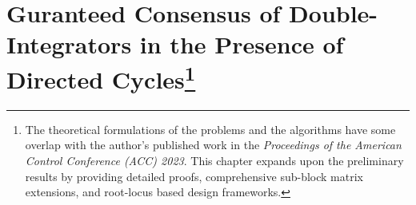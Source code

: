 \chapter[Guaranteed Consensus in Directed Cyclic Networks]{Guranteed Consensus of Double-Integrators in the Presence of Directed Cycles\footnote{The theoretical formulations of the problems and the algorithms have some overlap with the author's published work in the \emph{Proceedings of the American Control Conference (ACC) 2023}. This chapter expands upon the preliminary results by providing detailed proofs, comprehensive sub-block matrix extensions, and root-locus based design frameworks.}}\label{ch:Guaranteed_Consensus}

